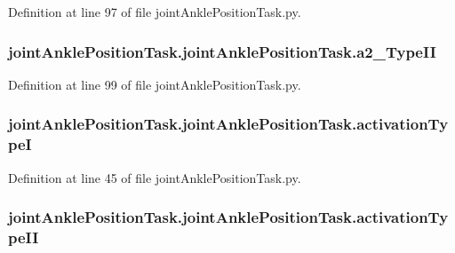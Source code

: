 Definition at line 97 of file joint\+Ankle\+Position\+Task.\+py.

\subsubsection[{\texorpdfstring{a2\+\_\+\+Type\+II}{a2_TypeII}}]{\setlength{\rightskip}{0pt plus 5cm}joint\+Ankle\+Position\+Task.\+joint\+Ankle\+Position\+Task.\+a2\+\_\+\+Type\+II}\hypertarget{classjoint_ankle_position_task_1_1joint_ankle_position_task_a09e1c2943ecc5b4e9a0ec3cb21a56411}{}\label{classjoint_ankle_position_task_1_1joint_ankle_position_task_a09e1c2943ecc5b4e9a0ec3cb21a56411}


Definition at line 99 of file joint\+Ankle\+Position\+Task.\+py.

\subsubsection[{\texorpdfstring{activation\+TypeI}{activationTypeI}}]{\setlength{\rightskip}{0pt plus 5cm}joint\+Ankle\+Position\+Task.\+joint\+Ankle\+Position\+Task.\+activation\+TypeI}\hypertarget{classjoint_ankle_position_task_1_1joint_ankle_position_task_acee16ab376b0dc001488d450dae957a4}{}\label{classjoint_ankle_position_task_1_1joint_ankle_position_task_acee16ab376b0dc001488d450dae957a4}


Definition at line 45 of file joint\+Ankle\+Position\+Task.\+py.

\subsubsection[{\texorpdfstring{activation\+Type\+II}{activationTypeII}}]{\setlength{\rightskip}{0pt plus 5cm}joint\+Ankle\+Position\+Task.\+joint\+Ankle\+Position\+Task.\+activation\+Type\+II}\hypertarget{classjoint_ankle_position_task_1_1joint_ankle_position_task_a3c56e0e9ea474f09ee101fb0a37b7cad}{}\label{classjoint_ankle_position_task_1_1joint_ankle_position_task_a3c56e0e9ea474f09ee101fb0a37b7cad}



